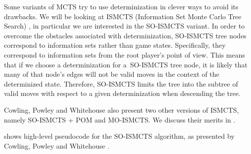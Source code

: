Some variants of MCTS try to use determinization in clever ways to avoid its drawbacks.
We will be looking at ISMCTS (Information Set Monte Carlo Tree Search)
\cite{Cowling12}, in particular we are interested in the SO-ISMCTS variant.
In order to overcome the obstacles associated with determinization, SO-ISMCTS
tree nodes correspond to information sets rather than game states. Specifically,
they correspond to information sets from the root player's point of view. This
means that if we choose a determinization for a~SO-ISMCTS tree node, it is likely
that many of that node's edges will not be valid moves in the context
of the determinized state. Therefore, SO-ISMCTS limits the tree into the subtree
of valid moves with respect to a given determinization when descending the tree.

Cowling, Powley and Whitehouse \cite{Cowling12} also present two other versions
of ISMCTS, namely SO-ISMCTS + POM and MO-ISMCTS. We discuss their merits
in .


 shows high-level pseudocode for the SO-ISMCTS algorithm,
as presented by Cowling, Powley and Whitehouse \cite{Cowling12}.


